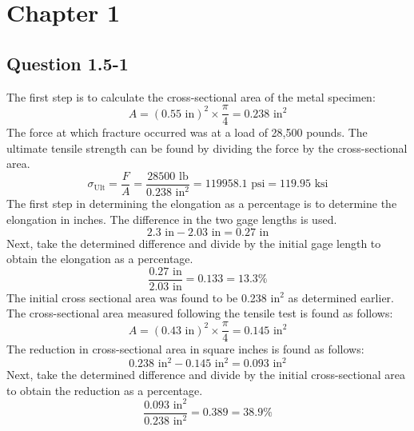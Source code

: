 \documentclass{article}
\begin{document}
    \section*{Chapter 1}
    \subsection*{Question 1.5-1}
    The first step is to calculate the cross-sectional area of the metal specimen:
    \[A=(0.55\text{ in})^2\times\frac{\pi}{4}=0.238 \text{ in}^2\]
    The force at which fracture occurred was at a load of 28,500 pounds. The ultimate tensile strength can be found by dividing the force by the cross-sectional area.
    \[\sigma_\text{Ult}=\frac{F}{A}=\frac{28500 \text{ lb}}{0.238 \text{ in}^2}=119958.1\text{ psi}=\boxed{119.95\text{ ksi}}\]
    The first step in determining the elongation as a percentage is to determine the elongation in inches. The difference in the two gage lengths is used.
    \[2.3 \text{ in}-2.03\text{ in}=0.27\text{ in}\] 
    Next, take the determined difference and divide by the initial gage length to obtain the elongation as a percentage.
    \[\frac{0.27\text{ in}}{2.03\text{ in}}=0.133=\boxed{13.3\%}\]
    The initial cross sectional area was found to be 0.238 \(\text{in}^2\) as determined earlier. The cross-sectional area measured following the tensile test is found as follows:
    \[A=(0.43\text{ in})^2\times\frac{\pi}{4}=0.145 \text{ in}^2\]
    The reduction in cross-sectional area in square inches is found as follows:
    \[0.238 \text{ in}^2-0.145 \text{ in}^2=0.093\text{ in}^2\]
    Next, take the determined difference and divide by the initial cross-sectional area to obtain the reduction as a percentage.
    \[\frac{0.093\text{ in}^2}{0.238 \text{ in}^2}=0.389=\boxed{38.9\%}\]
    \newpage
\end{document}
